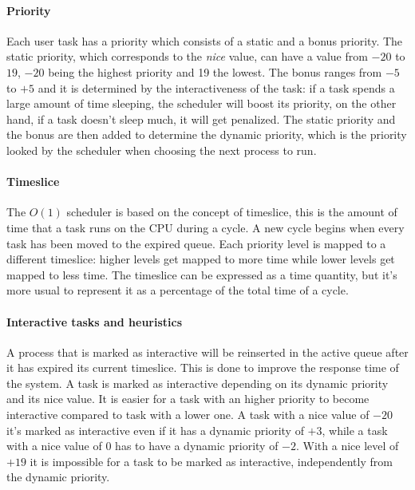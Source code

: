 \paragraph{Priority} %
Each user task has a priority which consists of a static and a bonus priority. The static priority, which corresponds to the \textit{nice} value, can have a value from $-20$ to $19$, $-20$ being the highest priority and 19 the lowest. The bonus ranges from $-5$ to $+5$ and it is determined by the interactiveness of the task: if a task spends a large amount of time sleeping, the scheduler will boost its priority, on the other hand, if a task doesn't sleep much, it will get penalized. %
The static priority and the bonus are then added to determine the dynamic priority, which is the priority looked by the scheduler when choosing the next process to run.

\paragraph{Timeslice} %
The $O(1)$ scheduler is based on the concept of timeslice, this is the amount of time that a task runs on the CPU during a cycle. A new cycle begins when every task has been moved to the expired queue. Each priority level is mapped to a different timeslice: higher levels get mapped to more time while lower levels get mapped to less time. The timeslice can be expressed as a time quantity, but it's more usual to represent it as a percentage of the total time of a cycle.

\paragraph{Interactive tasks and heuristics} %
A process that is marked as interactive will be reinserted in the
active queue after it has expired its current timeslice. This is done 
to improve the response time of the system. A task is
marked as interactive depending on its dynamic priority and its nice
value. It is easier for a task with an higher priority to become interactive compared to task with a lower one. A task with a nice value of $-20$ it's marked as interactive
even if it has a dynamic priority of $+3$, while a task with a nice
value of $0$ has to have a dynamic priority of $-2$. With a nice level
of $+19$ it is impossible for a task to be marked as interactive, independently from the dynamic priority. %

